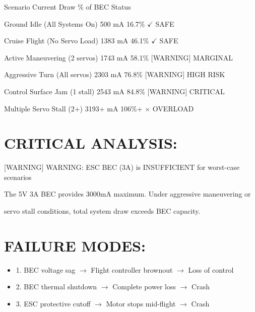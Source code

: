 \documentclass[11pt,letterpaper]{article}
\begin{document}
Scenario                           Current Draw    \% of BEC     Status\par

Ground Idle (All Systems On)         500 mA         16.7\%      $\checkmark$ SAFE\par

Cruise Flight (No Servo Load)        1383 mA        46.1\%      $\checkmark$ SAFE\par

Active Maneuvering (2 servos)        1743 mA        58.1\%      [WARNING] MARGINAL\par

Aggressive Turn (All servos)         2303 mA        76.8\%      [WARNING] HIGH RISK\par

Control Surface Jam (1 stall)        2543 mA        84.8\%      [WARNING] CRITICAL\par

Multiple Servo Stall (2+)            3193+ mA       106\%+      $\times$ OVERLOAD\par

\section{CRITICAL ANALYSIS:}

[WARNING] WARNING: ESC BEC (3A) is INSUFFICIENT for worst-case scenarios\par

The 5V 3A BEC provides 3000mA maximum. Under aggressive maneuvering or\par

servo stall conditions, total system draw exceeds BEC capacity.\par

\section{FAILURE MODES:}

\begin{itemize}
  \item 1. BEC voltage sag $\rightarrow$ Flight controller brownout $\rightarrow$ Loss of control
  \item 2. BEC thermal shutdown $\rightarrow$ Complete power loss $\rightarrow$ Crash
  \item 3. ESC protective cutoff $\rightarrow$ Motor stops mid-flight $\rightarrow$ Crash
\end{itemize}
\end{document}
